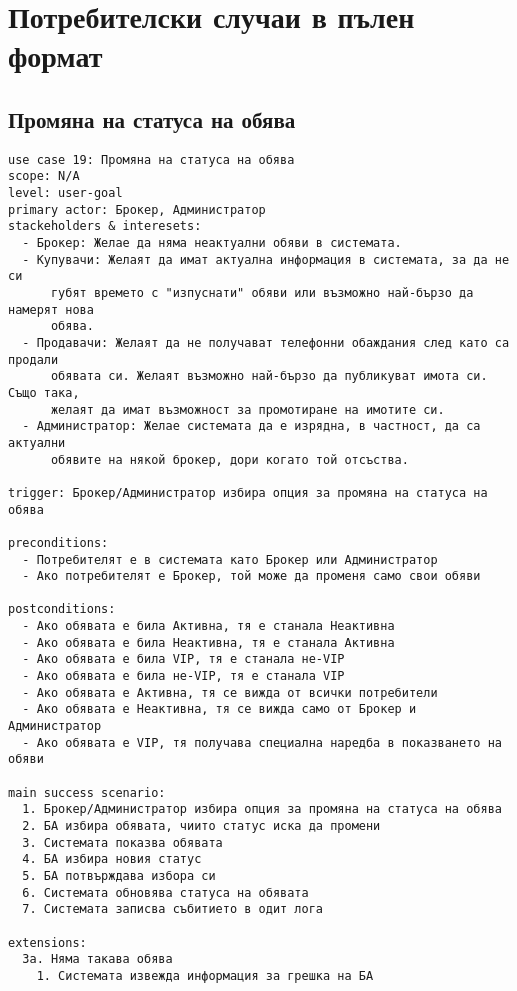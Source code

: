 \documentclass[a4paper,12pt]{article}
\begin{document}
\newpage

\section{Потребителски случаи в пълен формат}

\subsection{Промяна на статуса на обява}

\begin{verbatim}
use case 19: Промяна на статуса на обява
scope: N/A
level: user-goal
primary actor: Брокер, Администратор
stackeholders & interesets:
  - Брокер: Желае да няма неактуални обяви в системата.
  - Купувачи: Желаят да имат актуална информация в системата, за да не си
      губят времето с "изпуснати" обяви или възможно най-бързо да намерят нова
      обява.
  - Продавачи: Желаят да не получават телефонни обаждания след като са продали
      обявата си. Желаят възможно най-бързо да публикуват имота си. Също така, 
      желаят да имат възможност за промотиране на имотите си.
  - Администратор: Желае системата да е изрядна, в частност, да са актуални
      обявите на някой брокер, дори когато той отсъства.

trigger: Брокер/Администратор избира опция за промяна на статуса на обява

preconditions:
  - Потребителят е в системата като Брокер или Администратор
  - Ако потребителят е Брокер, той може да променя само свои обяви

postconditions:
  - Ако обявата е била Активна, тя е станала Неактивна
  - Ако обявата е била Неактивна, тя е станала Активна
  - Ако обявата е била VIP, тя е станала не-VIP
  - Ако обявата е била не-VIP, тя е станала VIP
  - Ако обявата е Активна, тя се вижда от всички потребители
  - Ако обявата е Неактивна, тя се вижда само от Брокер и Администратор
  - Ако обявата е VIP, тя получава специална наредба в показването на обяви

main success scenario:
  1. Брокер/Администратор избира опция за промяна на статуса на обява
  2. БА избира обявата, чиито статус иска да промени
  3. Системата показва обявата
  4. БА избира новия статус
  5. БА потвърждава избора си
  6. Системата обновява статуса на обявата
  7. Системата записва събитието в одит лога

extensions:
  3a. Няма такава обява
    1. Системата извежда информация за грешка на БА


\end{verbatim}
\end{document}
